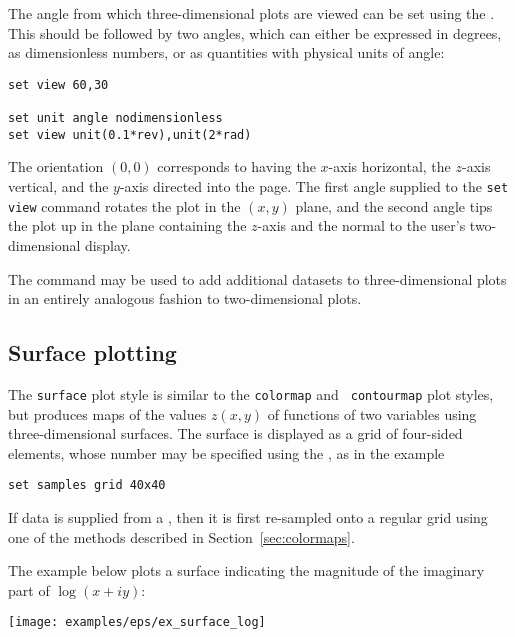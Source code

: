 The angle from which three-dimensional plots are viewed can be set using the
. This should be followed by two angles, which can either be
expressed in degrees, as dimensionless numbers, or as quantities with physical
units of angle:
\begin{verbatim}
set view 60,30

set unit angle nodimensionless
set view unit(0.1*rev),unit(2*rad)
\end{verbatim}
The orientation $(0,0)$ corresponds to having the $x$-axis horizontal, the
$z$-axis vertical, and the $y$-axis directed into the page. The first angle
supplied to the {\tt set view} command rotates the plot in the $(x,y)$ plane,
and the second angle tips the plot up in the plane containing the $z$-axis and
the normal to the user's two-dimensional display.

The  command may be used to add additional datasets to
three-dimensional plots in an entirely analogous fashion to two-dimensional
plots.

\subsection{Surface plotting}
\label{sec:surfaces}

The {\tt surface} plot style is similar to the {\tt colormap} and {\tt
contourmap} plot styles, but produces maps of the values $z(x,y)$ of functions
of two variables using three-dimensional surfaces. The surface is displayed as
a grid of four-sided elements, whose number may be specified using the
, as in the example
\begin{verbatim}
set samples grid 40x40
\end{verbatim}
If data is supplied from a \datafile, then it is first re-sampled onto a regular
grid using one of the methods described in Section~\ref{sec:colormaps}.

The example below plots a surface indicating the magnitude of the imaginary
part of $\log(x+iy)$:

\vspace{2mm}

\vspace{2mm}
\centerline{\texttt{[image: examples/eps/ex\_surface\_log]}}
\vspace{2mm}


